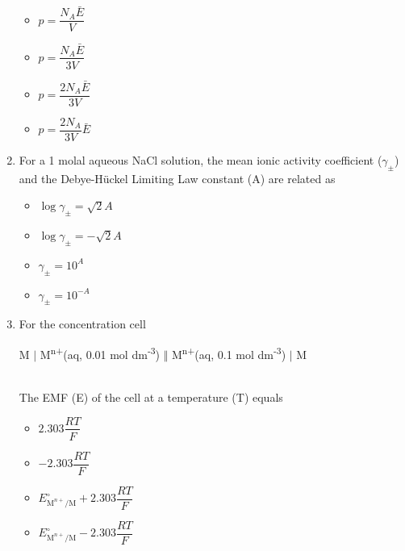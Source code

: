 \documentclass[journal,12pt,onecolumn]{IEEEtran}
\theoremstyle{remark}
\begin{document}
\begin{enumerate}
\begin{multicols}{2}
\begin{itemize}[label=(A)]
    \item \(p = \dfrac{N_A \bar{E}}{V}\)
    \item \(p = \dfrac{N_A \bar{E}}{3V}\)
    \item \(p = \dfrac{2 N_A \bar{E}}{3V}\)
    \item \(p = \dfrac{2 N_A}{3V} \bar{E}\)
\end{itemize}
\end{multicols}

 

\item    \hspace{0.5cm} For a 1 molal aqueous NaCl solution, the mean ionic activity coefficient (\(\gamma_{\pm}\)) and the Debye-Hückel Limiting Law constant (A) are related as  \hfill{}

\begin{multicols}{2}
\begin{itemize}[label=(A)]
    \item \(\log \gamma_{\pm} = \sqrt{2} A\)
    \item \(\log \gamma_{\pm} = - \sqrt{2} A\)
    \item \(\gamma_{\pm} = 10^A\)
    \item \(\gamma_{\pm} = 10^{-A}\)
\end{itemize}
\end{multicols}

 

\item    \hspace{0.5cm} For the concentration cell\\
\centerline{M $\vert$ M\textsuperscript{n+}(aq, 0.01 mol dm\textsuperscript{-3}) $\Vert$ M\textsuperscript{n+}(aq, 0.1 mol dm\textsuperscript{-3}) $\vert$ M}\\
The EMF (E) of the cell at a temperature (T) equals  \hfill{}

\begin{multicols}{2}
\begin{itemize}[label=(A)]
    \item \(2.303 \dfrac{RT}{F}\)
    \item \(-2.303 \dfrac{RT}{F}\)
    \item \(E^\circ_{\text{M}^{n+}/\text{M}} + 2.303 \dfrac{RT}{F}\)
    \item \(E^\circ_{\text{M}^{n+}/\text{M}} - 2.303 \dfrac{RT}{F}\)
\end{itemize}
\end{multicols}


\end{enumerate}
\end{document}
